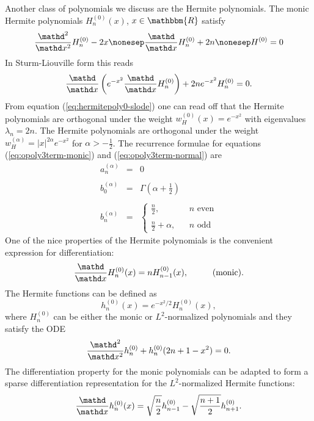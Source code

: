 \label{app:polynomials-hermite}Another class of polynomials we discuss
are the Hermite polynomials. The monic Hermite polynomials $H^{(0)}_n (x)$, $x
\in \mathbbm{R}$ satisfy
\begin{equation}
  \label{eq:hermitepoly0-ode} \frac{\mathd^2}{\mathd x^2} H_n^{(0)} - 2 x
  \nonesep \frac{\mathd}{\mathd x} H^{(0)}_n + 2 n \nonesep H^{(0)} = 0
\end{equation}
In Sturm-Liouville form this reads
\begin{equation}
  \label{eq:hermitepoly0-slode} \frac{\mathd}{\mathd x} \left( e^{- x^2} 
  \frac{\mathd}{\mathd x} H^{(0)}_n \right) + 2 ne^{- x^2} H^{(0)}_n = 0.
\end{equation}
From equation (\ref{eq:hermitepoly0-slode}) one can read off that the Hermite
polynomials are orthogonal under the weight $w_H^{(0)} (x) = e^{- x^2}$ with
eigenvalues $\lambda_n = 2 n$. The  Hermite polynomials
are orthogonal under the weight $w_H^{(\alpha)} = |x|^{2 \alpha} e^{- x^2}$
for $\alpha > - \frac{1}{2}$. The recurrence formulae for equations
(\ref{eq:opoly3term-monic}) and (\ref{eq:opoly3term-normal}) are
\[ \begin{array}{lll}
     a_n^{(\alpha)} & = & 0\\
     &  & \\
     b_0^{(\alpha)} & = & \Gamma \left( \alpha + \frac{1}{2} \right)\\
     &  & \\
     b_n^{(\alpha)} & = & \left\{ \begin{array}{lll}
       \frac{n}{2}, &  & n \text{ even}\\
       &  & \\
       \frac{n}{2} + \alpha, &  & n \text{ odd}
     \end{array} \right.
   \end{array} \]
One of the nice properties of the Hermite polynomials is the convenient expression
for differentiation:
\[ \frac{\mathd}{\mathd x} H_n^{(0)} (x) = nH_{n - 1}^{(0)} (x), \hspace{1cm} 
   \text{(monic).} \]
The Hermite functions can be defined as
\[ h_n^{(0)} (x) = e^{- x^2 / 2} H^{(0)}_n (x), \]
where $H_n^{(0)}$ can be either the monic or $L^2$-normalized polynomials and
they satisfy the ODE
\begin{equation}
  \label{eq:hermitefun-slode} \frac{\mathd^2}{\mathd x^2} h^{(0)}_n +
  h_n^{(0)} (2 n + 1 - x^2) = 0.
\end{equation}
The differentiation property for the monic polynomials can be adapted to form
a sparse differentiation representation for the $L^2$-normalized Hermite
functions:
\[ \frac{\mathd}{\mathd x} h_n^{(0)} (x) = \sqrt{\frac{n}{2}} h_{n - 1}^{(0)}
   - \sqrt{\frac{n + 1}{2}} h_{n + 1}^{(0)} . \]


